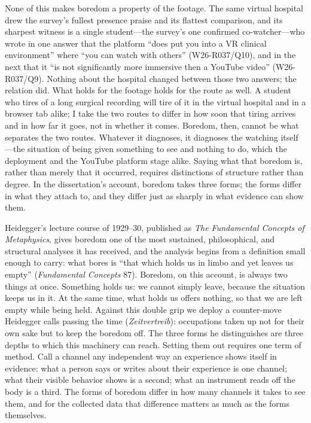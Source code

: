 None of this makes boredom a property of the footage. The same virtual
hospital drew the survey's fullest presence praise and its flattest
comparison, and its sharpest witness is a single student---the survey's
one confirmed co-watcher---who wrote in one answer that the platform
``does put you into a VR clinical environment'' where ``you can watch
with others'' (W26-R037/Q10), and in the next that it ``is not
significantly more immersive then a YouTube video'' (W26-R037/Q9).
Nothing about the hospital changed between those two answers; the
relation did. What holds for the footage holds for the route as well. A
student who tires of a long surgical recording will tire of it in the
virtual hospital and in a browser tab alike; I take the two routes to
differ in how soon that tiring arrives and in how far it goes, not in
whether it comes. Boredom, then, cannot be what separates the two
routes. Whatever it diagnoses, it diagnoses the watching itself---the
situation of being given something to see and nothing to do, which the
deployment and the YouTube platform stage alike. Saying what that
boredom is, rather than merely that it occurred, requires distinctions
of structure rather than degree. In the dissertation's account, boredom
takes three forms; the forms differ in what they attach to, and they
differ just as sharply in what evidence can show them.

Heidegger's lecture course of 1929--30, published as \textit{The
Fundamental Concepts of Metaphysics}, gives boredom one of the most
sustained, philosophical, and structural analyses it has received, and
the analysis begins from a definition small enough to carry: what
bores is ``that which holds us in limbo and yet leaves us empty''
(\textit{Fundamental Concepts} 87). Boredom, on this account, is
always two things at once. Something holds us: we cannot simply leave,
because the situation keeps us in it. At the same time, what holds us
offers nothing, so that we are left empty while being held. Against this
double grip we deploy a counter-move Heidegger calls passing the time
(\textit{Zeitvertreib}): occupations taken up not for their own sake
but to keep the boredom off. The three forms he distinguishes are
three depths to which this machinery can reach. Setting them out
requires one term of method. Call a channel any independent way an
experience shows itself in evidence: what a person says or writes
about their experience is one channel; what their visible behavior
shows is a second; what an instrument reads off the body is a third.
The forms of boredom differ in how many channels it takes to see them,
and for the collected data that difference matters as much as the
forms themselves.

